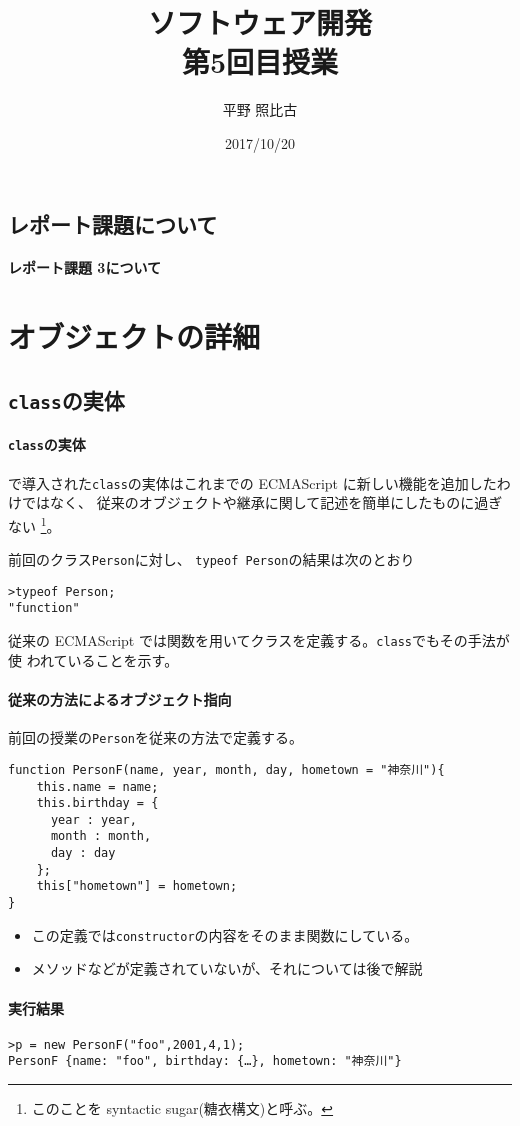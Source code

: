 
%
\title{ソフトウェア開発\\第5回目授業}
\author{平野 照比古}
\institute{}
\date{2017/10/20}

\frame{\maketitle}
\newcommand{\ElmJ}[1]{\texttt{#1}}
\section{レポート課題について}
\begin{frame}[containsverbatim]
 \frametitle{レポート課題 3について}
\end{frame}
\chapter{オブジェクトの詳細}
\section{\protect\texttt{class}の実体}
\begin{frame}[containsverbatim]
\frametitle{\ElmJ{class}の実体}
\ES で導入された\ElmJ{class}の実体はこれまでの
 ECMAScript に新しい機能を追加したわけではなく、
 従来のオブジェクトや継承に関して記述を簡単にしたものに過ぎない
 \footnote{このことを syntactic sugar(糖衣構文)と呼ぶ。}。
 
 前回のクラス\texttt{Person}に対し、
 \texttt{typeof Person}の結果は次のとおり
\begin{Verbatim}
>typeof Person;
"function"
\end{Verbatim}
従来の ECMAScript では関数を用いてクラスを定義する。\ElmJ{class}でもその手法が使
われていることを示す。
\end{frame}
\begin{frame}[containsverbatim]
 \frametitle{従来の方法によるオブジェクト指向}
 前回の授業の\texttt{Person}を従来の方法で定義する。
\begin{Verbatim}
function PersonF(name, year, month, day, hometown = "神奈川"){
    this.name = name;
    this.birthday = {
      year : year,
      month : month,
      day : day
    };
    this["hometown"] = hometown;
}
\end{Verbatim}
 \begin{itemize}
  \item この定義では\ElmJ{constructor}の内容をそのまま関数にしている。
  \item メソッドなどが定義されていないが、それについては後で解説
 \end{itemize}
\end{frame}
\begin{frame}[containsverbatim]
\frametitle{実行結果}
\begin{Verbatim}
>p = new PersonF("foo",2001,4,1);
PersonF {name: "foo", birthday: {…}, hometown: "神奈川"}
\end{Verbatim}
\end{frame}
